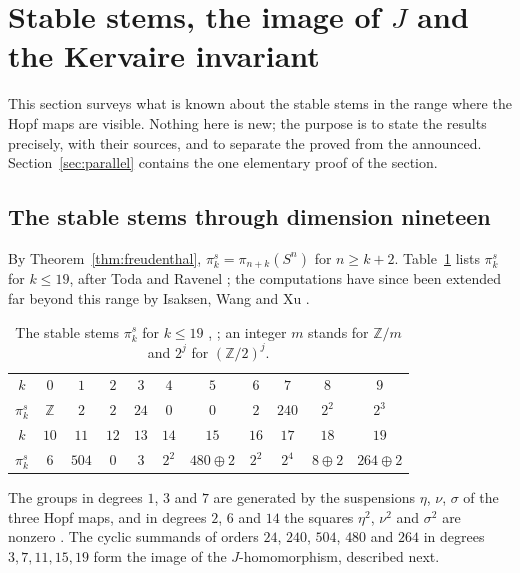 \documentclass[11pt]{amsart}
\numberwithin{equation}{section}
\theoremstyle{plain}
\theoremstyle{definition}
\theoremstyle{remark}
\newcommand{\Z}{\mathbb{Z}}
\begin{document}
\section{Stable stems, the image of \texorpdfstring{$J$}{J} and the Kervaire invariant}\label{ch:stable}

This section surveys what is known about the stable stems in the range where the Hopf maps are visible. Nothing here is new; the purpose is to state the results precisely, with their sources, and to separate the proved from the announced. Section~\ref{sec:parallel} contains the one elementary proof of the section.

\subsection{The stable stems through dimension nineteen}\label{sec:stems}

By Theorem~\ref{thm:freudenthal}, $\pi_k^s=\pi_{n+k}(S^n)$ for $n\ge k+2$. Table~\ref{tab:stable} lists $\pi_k^s$ for $k\le19$, after Toda \cite{Tod62} and Ravenel \cite[Table~A3.3]{Rav86}; the computations have since been extended far beyond this range by Isaksen, Wang and Xu \cite{IWX23}.

\begin{table}[htbp]
\centering
\small
\begin{tabular}{@{}c|cccccccccc@{}}
\toprule
$k$ & $0$ & $1$ & $2$ & $3$ & $4$ & $5$ & $6$ & $7$ & $8$ & $9$\\
$\pi_k^s$ & $\Z$ & $2$ & $2$ & $24$ & $0$ & $0$ & $2$ & $240$ & $2^2$ & $2^3$\\
\midrule
$k$ & $10$ & $11$ & $12$ & $13$ & $14$ & $15$ & $16$ & $17$ & $18$ & $19$\\
$\pi_k^s$ & $6$ & $504$ & $0$ & $3$ & $2^2$ & $480{\oplus}2$ & $2^2$ & $2^4$ & $8{\oplus}2$ & $264{\oplus}2$\\
\bottomrule
\end{tabular}
\caption{The stable stems $\pi_k^s$ for $k\le19$ \cite{Tod62}, \cite[Table~A3.3]{Rav86}; an integer $m$ stands for $\Z/m$ and $2^j$ for $(\Z/2)^j$.}
\label{tab:stable}
\end{table}

The groups in degrees $1$, $3$ and $7$ are generated by the suspensions $\eta$, $\nu$, $\sigma$ of the three Hopf maps, and in degrees $2$, $6$ and $14$ the squares $\eta^2$, $\nu^2$ and $\sigma^2$ are nonzero \cite{Tod62}. The cyclic summands of orders $24$, $240$, $504$, $480$ and $264$ in degrees $3,7,11,15,19$ form the image of the $J$-homomorphism, described next.
\end{document}
